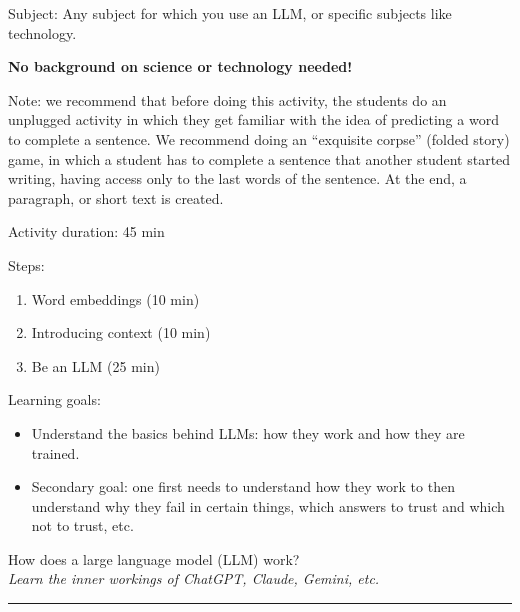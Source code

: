 \documentclass[12pt]{article}
\begin{document}
\vspace*{0.5\textheight}

Subject: Any subject for which you use an LLM, or specific subjects like technology.

\vspace{0.3cm}
\textbf{No background on science or technology needed!}

Note: we recommend that before doing this activity, the students do an unplugged activity in which they get familiar with the idea of predicting a word to complete a sentence. We recommend doing an ``exquisite corpse'' (folded story) game, in which a student has to complete a sentence that another student started writing, having access only to the last words of the sentence. At the end, a paragraph, or short text is created. 
\vspace{0.3cm}

Activity duration: 45 min

\vspace{0.5cm}

Steps:
\begin{enumerate}
    \item Word embeddings (10 min)
    \item Introducing context (10 min) 
    \item Be an LLM (25 min)
\end{enumerate}

Learning goals:

\begin{itemize}
    \item Understand the basics behind LLMs: how they work and how they are trained.
    \item Secondary goal: one first needs to understand how they work to then understand why they fail in certain things, which answers to trust and which not to trust, etc.

\end{itemize}

\newpage

\begin{center}
    {\LARGE \color{maincolor} How does a large language model (LLM) work?}\\[5pt]
    {\large \textit{Learn the inner workings of ChatGPT, Claude, Gemini, etc.}}\\
    \rule{\linewidth}{1pt}
\end{center}

\vspace{0.5cm}
\end{document}
